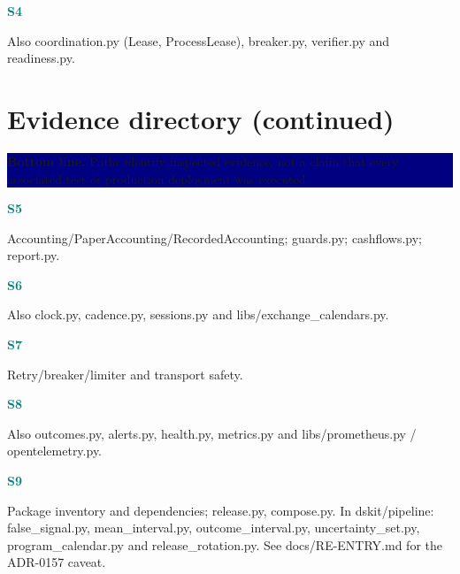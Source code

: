 \documentclass[10pt,letterpaper]{article}
\newcommand{\bl}[1]{\noindent\colorbox{navy}{\parbox{\dimexpr\linewidth-2\fboxsep}{\color{white}\textbf{Bottom line.} #1}}\par\medskip}
\newcommand{\topic}[2]{\clearpage\section{#1}\bl{#2}}
\newcommand{\sub}[1]{\par\textbf{\textcolor{teal}{#1}}\par}
\begin{document}
\sub{S4}
{\small{}}\par
Also coordination.py (Lease, ProcessLease), breaker.py, verifier.py and readiness.py.
\topic{Evidence directory (continued)}{Paths identify inspected evidence, not a claim that every associated test or production deployment was executed.}
\sub{S5}
{\small{}}\par
Accounting/PaperAccounting/RecordedAccounting; guards.py; cashflows.py; report.py.
\sub{S6}
{\small{}}\par
Also clock.py, cadence.py, sessions.py and libs/exchange\_calendars.py.
\sub{S7}
{\small{}}\par
Retry/breaker/limiter and transport safety.
\sub{S8}
{\small{}}\par
Also outcomes.py, alerts.py, health.py, metrics.py and libs/prometheus.py / opentelemetry.py.
\sub{S9}
{\small{}}\par
Package inventory and dependencies; release.py, compose.py. In dskit/pipeline: false\_signal.py, mean\_interval.py, outcome\_interval.py, uncertainty\_set.py, program\_calendar.py and release\_rotation.py. See docs/RE-ENTRY.md for the ADR-0157 caveat.
\end{document}
